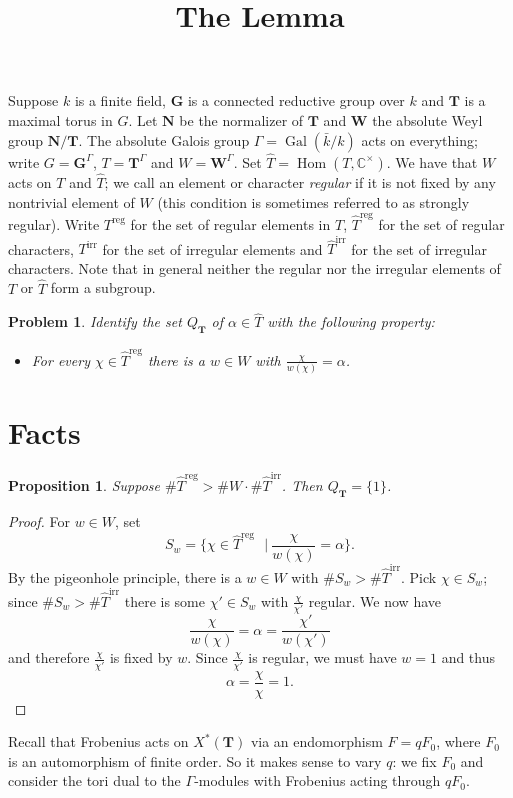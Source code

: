 \documentclass[11pt]{amsart}
\theoremstyle{plain}
\newtheorem{proposition}[theorem]{Proposition}
\newtheorem*{problem}{Problem}
\theoremstyle{definition}
\DeclareMathOperator{\Gal}{Gal}
\DeclareMathOperator{\Hom}{Hom}
\newcommand{\st}{\ensuremath{\ \ \ \vert\ }}
\newcommand{\CC}{\mathbb{C}}
\newcommand{\T}{\mathbf{T}}
\newcommand{\G}{\mathbf{G}}
\newcommand{\N}{\mathbf{N}}
\newcommand{\W}{\mathbf{W}}
\newcommand{\Galk}{\Gamma}
\newcommand{\hatT}{\hat{T}}
\newcommand{\Treg}{T^{\operatorname{reg}}}
\newcommand{\Threg}{\hatT^{\operatorname{reg}}}
\newcommand{\Tirr}{T^{\operatorname{irr}}}
\newcommand{\Thirr}{\hatT^{\operatorname{irr}}}
\begin{document}
\title{The Lemma}

Suppose $k$ is a finite field, $\G$ is a connected reductive group over $k$ and $\T$ is a maximal torus in $G$.  Let $\N$ be the normalizer of $\T$ and $\W$ the absolute Weyl group $\N / \T$.  The absolute Galois group $\Galk = \Gal(\bar{k}/k)$ acts on everything; write $G = \G^\Galk$, $T = \T^\Galk$ and $W = \W^\Galk$.  Set $\hatT = \Hom(T, \CC^\times)$.  We have that $W$ acts on $T$ and $\hat{T}$; we call an element or character \emph{regular} if it is not fixed by any nontrivial element of $W$ (this condition is sometimes referred to as strongly regular).  Write $\Treg$ for the set of regular elements in $T$, $\Threg$ for the set of regular characters, $\Tirr$ for the set of irregular elements and $\Thirr$ for the set of irregular characters.  Note that in general neither the regular nor the irregular elements of $T$ or $\hatT$ form a subgroup.

\begin{problem}
Identify the set $Q_{\T}$ of $\alpha \in \hatT$ with the following property:
\begin{itemize}
\item For every $\chi \in \Threg$ there is a $w \in W$ with $\frac{\chi}{w(\chi)} = \alpha$.
\end{itemize}
\end{problem}

\section{Facts}

\begin{proposition} \label{pigeonhole}
Suppose $\#\Threg > \# W \cdot \# \Thirr$.  Then $Q_{\T} = \{ 1 \}$.
\end{proposition}
\begin{proof}
For $w \in W$, set
$$S_w = \{\chi \in \Threg \st  \frac{\chi}{w(\chi)} = \alpha\}.$$
By the pigeonhole principle, there is a $w \in W$ with $\# S_w > \# \Thirr$.  Pick $\chi \in S_w$; since $\# S_w > \#\Thirr$ there is some $\chi' \in S_w$ with $\frac{\chi}{\chi'}$ regular.  We now have
$$\frac{\chi}{w(\chi)} = \alpha = \frac{\chi'}{w(\chi')}$$
and therefore $\frac{\chi}{\chi'}$ is fixed by $w$.  Since $\frac{\chi}{\chi'}$ is regular, we must have $w = 1$ and thus 
$$\alpha = \frac{\chi}{\chi} = 1.$$
\end{proof}

Recall that Frobenius acts on $X^*(\T)$ via an endomorphism $F = qF_0$, where $F_0$ is an automorphism of finite order.  So it makes sense to vary $q$: we fix $F_0$ and consider the tori dual to the $\Galk$-modules with Frobenius acting through $qF_0$.
\end{document}
